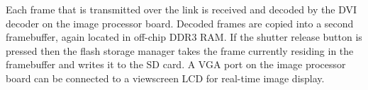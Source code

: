 Each frame that is transmitted over the link is received and decoded by the DVI decoder on the image processor board. Decoded frames are copied into a second framebuffer, again located in off-chip DDR3 RAM. If the shutter release button is pressed then the flash storage manager takes the frame currently residing in the framebuffer and writes it to the SD card. A VGA port on the image processor board can be connected to a viewscreen LCD for real-time image display.







